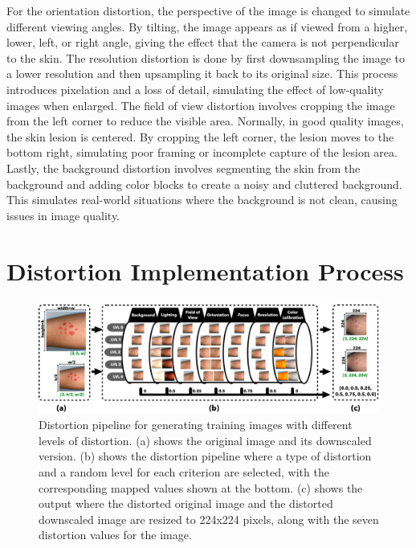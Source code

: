 For the orientation distortion, the perspective of the image is changed to simulate different viewing angles. By tilting, the image appears as if viewed from a higher, lower, left, or right angle, giving the effect that the camera is not perpendicular to the skin. The resolution distortion is done by first downsampling the image to a lower resolution and then upsampling it back to its original size. This process introduces pixelation and a loss of detail, simulating the effect of low-quality images when enlarged. The field of view distortion involves cropping the image from the left corner to reduce the visible area. Normally, in good quality images, the skin lesion is centered. By cropping the left corner, the lesion moves to the bottom right, simulating poor framing or incomplete capture of the lesion area. Lastly, the background distortion involves segmenting the skin from the background and adding color blocks to create a noisy and cluttered background. This simulates real-world situations where the background is not clean, causing issues in image quality. \par

\section{Distortion Implementation Process}
\label{sec:DistProcess}

\begin{figure}[ht]
    \centering
    \includegraphics[keepaspectratio,width=15cm]{img/Distortion_pipeline.png}
    \caption{Distortion pipeline for generating training images with different levels of distortion. (a) shows the original image and its downscaled version. (b) shows the distortion pipeline where a type of distortion and a random level for each criterion are selected, with the corresponding mapped values shown at the bottom. (c) shows the output where the distorted original image and the distorted downscaled image are resized to 224x224 pixels, along with the seven distortion values for the image.}
    \label{fig:DistPipeline}
\end{figure}

